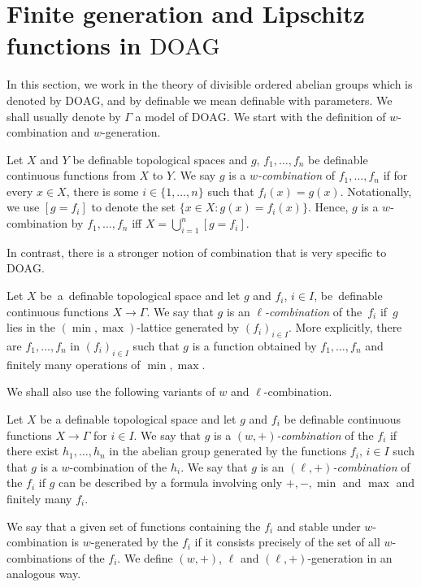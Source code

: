 \documentclass[JEP,XML,SOM,Unicode,ThmDefs,NoEqCountersInSection,published]{cedram}
\newcommand{\DOAG}{\mathrm{DOAG}}
\theoremstyle{plain}
\theoremstyle{definition}
\begin{document}
\section{Finite generation and Lipschitz functions in \texorpdfstring{$\DOAG$}{DOAG}}\label{section4}
In this section, we work in the theory of divisible ordered abelian groups which is denoted by $\DOAG$, and by definable we mean definable with parameters. We shall usually denote by
$\Gamma$ a model of $\DOAG$. We start with the definition of $w$-combination and $w$-generation.
\begin{defi}\label{def:t-gen}Let $X$ and $Y$ be definable topological spaces and $g$, $f_1,\ldots,f_n$ be definable continuous functions from $X$ to $Y$. We say $g$ is a \emph{$w$-combination} of $f_1,\ldots,f_n$ if for every $x\in X$, there is some $i\in \{1, \ldots, n\}$ such that $f_i(x)=g(x)$. Notationally, we use $[g=f_i]$ to denote the set $\{x\in X:g(x)=f_i(x)\}$. Hence, $g$ is a $w$-combination by $f_1,\ldots,f_n$ iff $X=\bigcup^n_{i=1}[g=f_i]$.
\end{defi}

In contrast, there is a stronger notion of combination that is very specific to $\DOAG$.
\begin{defi}\label{def:l-gen}Let $X$ be~a~definable topological space and let $g$ and $f_i$, $i\in I$, be~definable continuous functions $X\to \Gamma$. We say that $g$ is an \emph{$\ell$-combination} of the~$f_i$ if~$g$ lies in the $(\min,\max)$-lattice generated by $(f_i)_{i\in I}$. More explicitly, there are $f_1,\ldots,f_n$ in $(f_i)_{i\in I}$ such that $g$ is a function obtained by $f_1,\ldots,f_n$ and finitely many operations of $\min,\max$.
\end{defi}

We shall also use the following variants of $w$ and $\ell$-combination.
\begin{defi}\label{def:l-genvar}Let $X$ be a definable topological space and let $g$ and $f_i$
be definable continuous functions $X\to \Gamma$ for $i\in I$.
We say that $g$ is a \emph{$(w, +)$-combination} of the $f_i$ if there exist $h_1, \ldots, h_n$ in the abelian group generated by the functions $f_i$, $i \in I$ such that $g$ is a $w$-combination of the $h_i$.
We say that $g$ is an \emph{$(\ell, +)$-combination} of the $f_i$ if $g$ can be described by a formula involving only $+,-,\min$ and $\max$ and finitely many $f_i$.
\end{defi}

We say that a given set of functions containing the $f_i$ and stable under $w$\nobreakdash-combi\-nation is $w$-generated by the $f_i$ if it consists precisely of the set of all $w$-combinations of the $f_i$. We define $(w,+)$, $\ell$ and $(\ell,+)$-generation in an analogous way.
\end{document}
